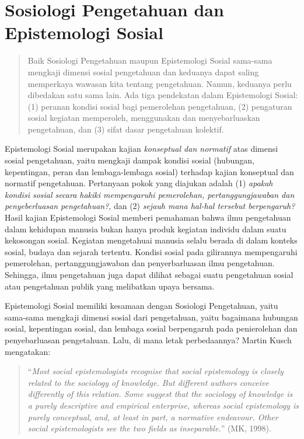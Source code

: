 \documentclass[11pt,twoside,a5paper,openany]{memoir}
\begin{document}
\hypertarget{sosiologi-pengetahuan-dan-epistemologi-sosial}{%
\section{Sosiologi Pengetahuan dan Epistemologi
Sosial}\label{sosiologi-pengetahuan-dan-epistemologi-sosial}}

\begin{quote}
Baik Sosiologi Pengetahuan maupun Epistemologi Sosial sama-sama mengkaji
dimensi sosial pengetahuan dan keduanya dapat saling memperkaya wawasan
kita tentang pengetahuan. Namun, keduanya perlu dibedakan satu sama
lain. Ada tiga pendekatan dalam Epistemologi Sosial: (1) peranan kondisi
sosial bagi pemerolehan pengetahuan, (2) pengaturan sosial kegiatan
memperoleh, menggunakan dan menyebarluaskan pengetahuan, dan (3) sifat
dasar pengetahuan kolektif.
\end{quote}

Epistemologi Sosial merupakan kajian \emph{konseptual dan normatif} atas
dimensi sosial pengetahuan, yaitu mengkaji dampak kondisi sosial
(hubungan, kepentingan, peran dan lembaga-lembaga sosial) terhadap
kajian konseptual dan normatif pengetahuan. Pertanyaan pokok yang
diajukan adalah (1) \emph{apakah kondisi sosial secara hakiki
mempengaruhi pemerolehan, pertanggungjawaban dan penyeberluasan
pengetahuan?}, dan (2) \emph{sejauh mana hal-hal tersebut berpengaruh?}
Hasil kajian Epistemologi Sosial memberi pemahaman bahwa ilmu
pengetahuan dalam kehidupan manusia bukan hanya produk kegiatan individu
dalam suatu kekosongan sosial. Kegiatan mengetahuai manusia selalu
berada di dalam konteks sosial, budaya dan sejarah tertentu. Kondisi
sosial pada gilirannya mempengaruhi pemerolehan, pertanggungjawaban dan
penyerbarluasan ilmu pengetahuan. Sehingga, ilmu pengetahuan juga dapat
dilihat sebagai suatu pengetahuan sosial atau pengetahuan publik yang
melibatkan upaya bersama.

Epistemologi Sosial memiliki kesamaan dengan Sosiologi Pengetahuan,
yaitu sama-sama mengkaji dimensi sosial dari pengetahuan, yaitu
bagaimana hubungan sosial, kepentingan sosial, dan lembaga sosial
berpengaruh pada penierolehan dan penyebarluasan pengetahuan. Lalu, di
mana letak perbedaannya? Martin Kusch mengatakan:

\begin{quote}
``\emph{Most social epistemologists recognise that social epistemology
is closely related to the sociology of knowledge. But different authors
conceive differently of this relation. Some suggest that the sociology
of knowledge is a purely descriptive and empirical enterprise, whereas
social epistemology is purely conceptual, and, at least in part, a
normative endeavour. Other social epistemologists see the two fields as
inseparable.}'' (MK, 1998).
\end{quote}
\end{document}
